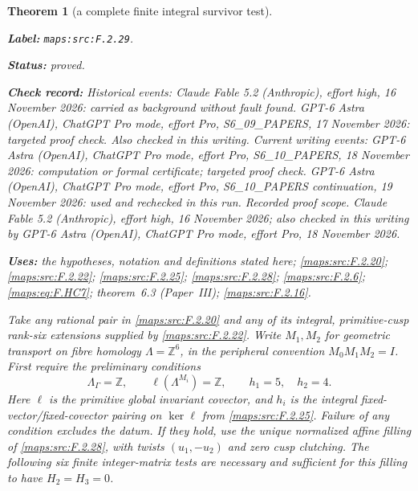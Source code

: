 \documentclass[11pt,a4paper]{article}
\newtheorem{theorem}{Theorem}[section]
\theoremstyle{definition}
\newcommand{\StatementRecord}[4]{\par\smallskip\begingroup\upshape\raggedright\noindent\textbf{Label:} \nolinkurl{#1}.\par\noindent\textbf{Status:} #2.\par\noindent\textbf{Check record:} #3.\par\noindent\textbf{Uses:} #4.\par\endgroup\smallskip}
\newcommand{\ExternalPaperRef}[3]{\ifmmode\text{\upshape #1#2 (Paper~#3)}\else #1#2 (Paper~#3)\fi}
\begin{document}
\begin{theorem}[a complete finite integral survivor test]\label{maps:src:F.2.29}
\StatementRecord{maps:src:F.2.29}{proved}{Historical events: Claude Fable 5.2 (Anthropic), effort high, 16 November 2026: carried as background without fault found. GPT-6 Astra (OpenAI), ChatGPT Pro mode, effort Pro, S6\_09\_PAPERS, 17 November 2026: targeted proof check. Also checked in this writing. Current writing events: GPT-6 Astra (OpenAI), ChatGPT Pro mode, effort Pro, S6\_10\_PAPERS, 18 November 2026: computation or formal certificate; targeted proof check. GPT-6 Astra (OpenAI), ChatGPT Pro mode, effort Pro, S6\_10\_PAPERS continuation, 19 November 2026: used and rechecked in this run. \emph{Recorded proof scope.} Claude Fable 5.2 (Anthropic), effort high, 16 November 2026; also checked in this writing by GPT-6 Astra (OpenAI), ChatGPT Pro mode, effort Pro, 18 November 2026}{the hypotheses, notation and definitions stated here; \cref{maps:src:F.2.20}; \cref{maps:src:F.2.22}; \cref{maps:src:F.2.25}; \cref{maps:src:F.2.28}; \cref{maps:src:F.2.6}; \cref{maps:eq:F.HC7}; \ExternalPaperRef{theorem~}{6.3}{III}; \cref{maps:src:F.2.16}}


Take any rational pair in \ref{maps:src:F.2.20} and any of its integral,
primitive-cusp rank-six extensions supplied by \ref{maps:src:F.2.22}.
Write $M_1,M_2$ for geometric transport on fibre homology
$\Lambda=\mathbb Z^6$, in the peripheral convention
$M_0M_1M_2=I$.
First require the preliminary conditions
\[
 \Lambda_\Gamma=\mathbb Z,\qquad
 \ell(\Lambda^{M_i})=\mathbb Z,\qquad h_1=5,\quad h_2=4 .
 \tag{F.HC1}\label{maps:eq:F.HC1}
\]
Here $\ell$ is the primitive global invariant covector, and
$h_i$ is the integral fixed-vector/fixed-covector pairing
on $\ker\ell$ from \ref{maps:src:F.2.25}.
Failure of any condition excludes the datum.
If they hold, use the unique normalized affine filling of
\ref{maps:src:F.2.28}, with twists $(u_1,-u_2)$ and zero cusp clutching.
The following six finite integer-matrix tests are necessary
and sufficient for this filling to have $H_2=H_3=0$.


\end{theorem}
\end{document}

